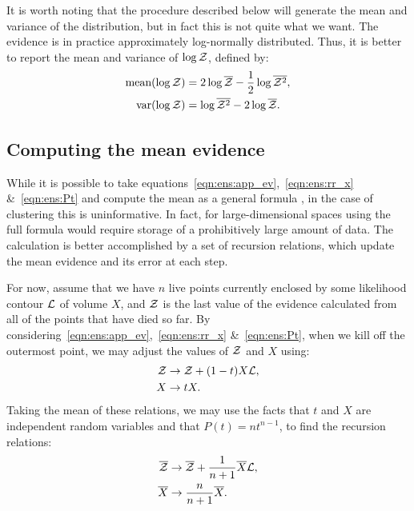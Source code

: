 It is worth noting that the procedure described below will generate the mean and variance of the distribution, but in fact this is not quite what we want. The evidence is in practice approximately log-normally distributed. Thus, it is better to report the mean and variance of \(\log\mathcal{Z}\), defined by:
\begin{align}
  \text{mean}(\log\mathcal{Z}) &= 2\log\overline{\mathcal{Z}} - \frac{1}{2}\log\overline{\mathcal{Z}^2},\\
  \text{var}(\log\mathcal{Z}) &= \log\overline{\mathcal{Z}^2}-2\log\overline{\mathcal{Z}}.
\end{align}


\subsection{Computing the mean evidence}
\label{sec:ens:basic_mean}

While it is possible to take equations~\eqref{eqn:ens:app_ev},~\eqref{eqn:ens:rr_x} \&~\eqref{eqn:ens:Pt} and compute the mean as a general formula \citep{Keeton}, in the case of clustering this is uninformative. 
In fact, for large-dimensional spaces using the full formula would require storage of a prohibitively large amount of data. The calculation is better accomplished by a set of recursion relations, which update the mean evidence and its error at each step. 

For now, assume that we have \(n\) live points currently enclosed by some likelihood contour \(\mathcal{L}\) of volume \(X\), and \(\mathcal{Z}\) is the last value of the evidence calculated from all of the points that have died so far. By considering~\eqref{eqn:ens:app_ev},~\eqref{eqn:ens:rr_x} \&~\eqref{eqn:ens:Pt}, when we kill off the outermost point, we may adjust the values of \(\mathcal{Z}\) and \(X\) using:
%
\begin{align}                                                         
\mathcal{Z} &\to \mathcal{Z} + (1-t)X\mathcal{L},
\label{eqn:ens:rr_Z}
\\
X &\to tX.
\label{eqn:ens:rr_X}
\end{align}
%
Taking the mean of these relations, we may use the facts that \(t\) and \(X\) are independent random variables and that \(P(t) = n t^{n-1}\), to find the recursion relations:
\begin{align}
  \overline{\mathcal{Z}} &\to \overline{\mathcal{Z}} + \frac{1}{n+1}\overline{X}\mathcal{L},
  \label{eqn:ens:rr_Zb}
  \\
  \overline{X} &\to \frac{n}{n+1}\overline{X}.
  \label{eqn:ens:rr_Xb}
\end{align}
%

